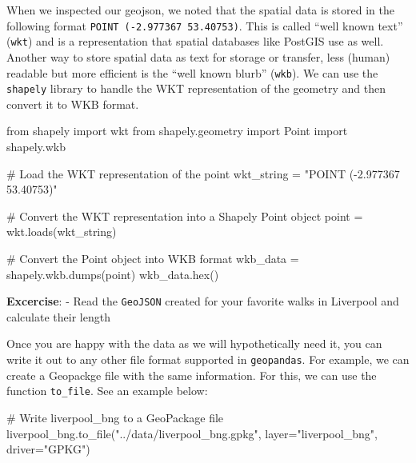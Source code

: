 \documentclass[
  letterpaper,
  DIV=11,
  numbers=noendperiod]{scrreprt}
\newenvironment{Shaded}{\begin{snugshade}}{\end{snugshade}}
\newcommand{\BuiltInTok}[1]{\textcolor[rgb]{0.00,0.23,0.31}{#1}}
\newcommand{\CommentTok}[1]{\textcolor[rgb]{0.37,0.37,0.37}{#1}}
\newcommand{\ImportTok}[1]{\textcolor[rgb]{0.00,0.46,0.62}{#1}}
\newcommand{\NormalTok}[1]{\textcolor[rgb]{0.00,0.23,0.31}{#1}}
\newcommand{\OperatorTok}[1]{\textcolor[rgb]{0.37,0.37,0.37}{#1}}
\newcommand{\StringTok}[1]{\textcolor[rgb]{0.13,0.47,0.30}{#1}}
\begin{document}
When we inspected our geojson, we noted that the spatial data is stored
in the following format \texttt{POINT\ (-2.977367\ 53.40753)}. This is
called ``well known text'' (\texttt{wkt}) and is a representation that
spatial databases like PostGIS use as well. Another way to store spatial
data as text for storage or transfer, less (human) readable but more
efficient is the ``well known blurb'' (\texttt{wkb}). We can use the
\texttt{shapely} library to handle the WKT representation of the
geometry and then convert it to WKB format.

\begin{Shaded}
\begin{Highlighting}[]
\ImportTok{from}\NormalTok{ shapely }\ImportTok{import}\NormalTok{ wkt}
\ImportTok{from}\NormalTok{ shapely.geometry }\ImportTok{import}\NormalTok{ Point}
\ImportTok{import}\NormalTok{ shapely.wkb}

\CommentTok{\# Load the WKT representation of the point}
\NormalTok{wkt\_string }\OperatorTok{=} \StringTok{"POINT ({-}2.977367 53.40753)"}

\CommentTok{\# Convert the WKT representation into a Shapely Point object}
\NormalTok{point }\OperatorTok{=}\NormalTok{ wkt.loads(wkt\_string)}

\CommentTok{\# Convert the Point object into WKB format}
\NormalTok{wkb\_data }\OperatorTok{=}\NormalTok{ shapely.wkb.dumps(point)}
\NormalTok{wkb\_data.}\BuiltInTok{hex}\NormalTok{()}
\end{Highlighting}
\end{Shaded}

\textbf{Excercise}: - Read the \texttt{GeoJSON} created for your
favorite walks in Liverpool and calculate their length

Once you are happy with the data as we will hypothetically need it, you
can write it out to any other file format supported in
\texttt{geopandas}. For example, we can create a Geopackge file with the
same information. For this, we can use the function \texttt{to\_file}.
See an example below:

\begin{Shaded}
\begin{Highlighting}[]
\CommentTok{\# Write \textquotesingle{}liverpool\_bng\textquotesingle{} to a GeoPackage file}
\NormalTok{liverpool\_bng.to\_file(}\StringTok{"../data/liverpool\_bng.gpkg"}\NormalTok{, layer}\OperatorTok{=}\StringTok{"liverpool\_bng"}\NormalTok{, driver}\OperatorTok{=}\StringTok{"GPKG"}\NormalTok{)}
\end{Highlighting}
\end{Shaded}
\end{document}
